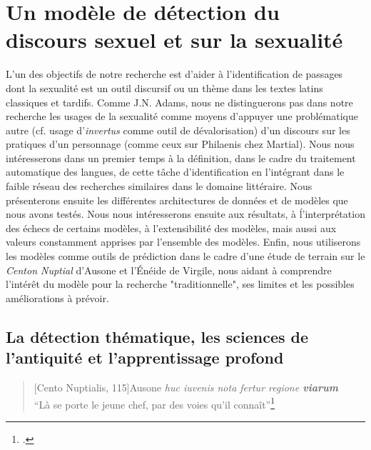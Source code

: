 \chapter{Un modèle de détection du discours sexuel et sur la sexualité}

L'un des objectifs de notre recherche est d'aider à l'identification de passages dont la sexualité est un outil discursif ou un thème dans les textes latins classiques et tardifs. Comme J.N. Adams, nous ne distinguerons pas dans notre recherche les usages de la sexualité comme moyens d'appuyer une problématique autre (cf. usage d'\textit{invertus} comme outil de dévalorisation) d'un discours sur les pratiques d'un personnage (comme ceux sur Philaenis chez Martial). Nous nous intéresserons dans un premier temps à la définition, dans le cadre du traitement automatique des langues, de cette tâche d'identification en l'intégrant dans le faible réseau des recherches similaires dans le domaine littéraire. Nous présenterons ensuite les différentes architectures de données et de modèles que nous avons testés. Nous nous intéresserons ensuite aux résultats, à ĺ'interprétation des échecs de certains modèles, à l'extensibilité des modèles, mais aussi aux valeurs constamment apprises par l'ensemble des modèles. Enfin, nous utiliserons les modèles comme outils de prédiction dans le cadre d'une étude de terrain sur le \textit{Centon Nuptial} d'Ausone et l'Énéide de Virgile, nous aidant à comprendre l'intérêt du modèle pour la recherche "traditionnelle", ses limites et les possibles améliorations à prévoir.

\section{La détection thématique, les sciences de l'antiquité et l'apprentissage profond}


\begin{quote}[Cento Nuptialis, 115]{Ausone}
    \textit{huc iuvenis nota fertur regione \textbf{viarum}} \\
    \enquote{Là se porte le jeune chef, par des voies qu'il connaît}\footcite{ausone_d_2010}
\end{quote}

